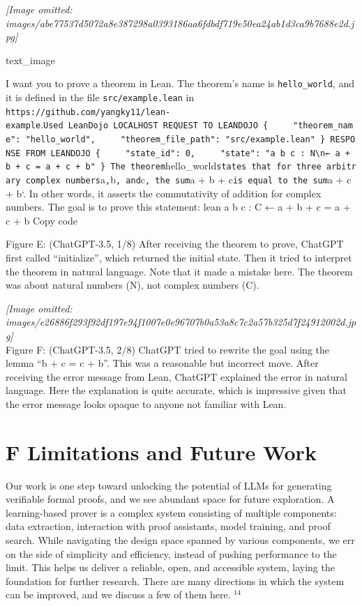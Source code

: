 \documentclass[
]{article}
\begin{document}
\textit{[Image omitted: images/abe77537d5072a8e387298a0393186aa6fdbdf719e50ea24ab1d3ca9b7688e2d.jpg]}

text\_image

I want you to prove a theorem in Lean. The theorem's name is
\texttt{hello\_world}, and it is defined in the file
\texttt{src/example.lean} in
\texttt{https://github.com/yangky11/lean-example}.\texttt{Used\ LeanDojo\ LOCALHOST\ REQUEST\ TO\ LEANDOJO\ \{\ \ \ \ \ "theorem\_name":\ "hello\_world",\ \ \ \ \ "theorem\_file\_path":\ "src/example.lean"\ \}\ RESPONSE\ FROM\ LEANDOJO\ \{\ \ \ \ \ "state\_id":\ 0,\ \ \ \ \ "state":\ "a\ b\ c\ :\ N\textbackslash{}n←\ a\ +\ b\ +\ c\ =\ a\ +\ c\ +\ b"\ \}\ The\ theorem}hello\_world\texttt{states\ that\ for\ three\ arbitrary\ complex\ numbers}a\texttt{,}b\texttt{,\ and}c\texttt{,\ the\ sum}a
+ b + c\texttt{is\ equal\ to\ the\ sum}a + c + b`. In other words, it
asserts the commutativity of addition for complex numbers. The goal is
to prove this statement: lean a b c : C ← a + b + c = a + c + b Copy
code

Figure E: (ChatGPT-3.5, 1/8) After receiving the theorem to prove,
ChatGPT first called ``initialize'', which returned the initial state.
Then it tried to interpret the theorem in natural language. Note that it
made a mistake here. The theorem was about natural numbers (N), not
complex numbers (C).

\textit{[Image omitted: images/e26886f293f92df197e94f1007e0e96707b0a53a8c7c2a57b325d7f24912002d.jpg]}\\
Figure F: (ChatGPT-3.5, 2/8) ChatGPT tried to rewrite the goal using the
lemma ``b + c = c + b''. This was a reasonable but incorrect move. After
receiving the error message from Lean, ChatGPT explained the error in
natural language. Here the explanation is quite accurate, which is
impressive given that the error message looks opaque to anyone not
familiar with Lean.

\section{F Limitations and Future
Work}\label{f-limitations-and-future-work}

Our work is one step toward unlocking the potential of LLMs for
generating verifiable formal proofs, and we see abundant space for
future exploration. A learning-based prover is a complex system
consisting of multiple components: data extraction, interaction with
proof assistants, model training, and proof search. While navigating the
design space spanned by various components, we err on the side of
simplicity and efficiency, instead of pushing performance to the limit.
This helps us deliver a reliable, open, and accessible system, laying
the foundation for further research. There are many directions in which
the system can be improved, and we discuss a few of them here. \(^{14}\)
\end{document}
